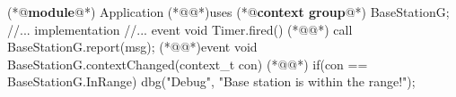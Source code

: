 \begin{Sbox}
\begin{minipage}{\columnwidth}
\begin{csource}
(*@\textbf{module}@*) Application {
  (*@@*)uses (*@\textbf{context group}@*) BaseStationG;
   //...
}implementation {
   //...
   event void Timer.fired() {
  (*@@*) call BaseStationG.report(msg);}
  (*@@*)event void BaseStationG.contextChanged(context_t con) {
  (*@@*) if(con == BaseStationG.InRange)
      dbg("Debug", "Base station is within the range!");}}
\end{csource}
\end{minipage}
\end{Sbox}